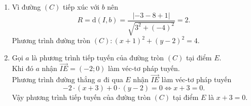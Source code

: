 \begin{bt}
{\begin{enumerate}
	Vậy $\Delta:x+2y-1=0$.
	\item Vì đường $(C)$ tiếp xúc với $b$ nên
	\[R=\mathrm{d}\left(I,b\right)=\dfrac{\left|-3-8+1\right|}{\sqrt{3^2+(-4)^2}}=2. \]
	Phương trình đường tròn $(C):(x+1)^2+(y-2)^2=4$.
	\item Gọi $a$ là phương trình tiếp tuyến của đường tròn $(C)$ tại điểm $E$.\\
	Khi đó $a$ nhận $\vec{IE}=(-2;0)$ làm véc-tơ pháp tuyến.\\
	Phương trình đường thẳng $a$ đi qua $E$ nhận $\vec{IE}$ làm véc-tơ pháp tuyến
	\[-2\cdot (x+3)+0\cdot (y-2)=0\Leftrightarrow x+3=0. \]
	Vậy phương trình tiếp tuyến của đường tròn $(C)$ tại điểm $E$ là $x+3=0$.
\end{enumerate}
}
\end{bt}
